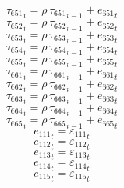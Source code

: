 \begin{dmath}
{{\tau_{651}}}_{t}={{\rho}}\, {{\tau_{651}}}_{t-1}+{{e_{651}}}_{t}
\end{dmath}
\begin{dmath}
{{\tau_{652}}}_{t}={{\rho}}\, {{\tau_{652}}}_{t-1}+{{e_{652}}}_{t}
\end{dmath}
\begin{dmath}
{{\tau_{653}}}_{t}={{\rho}}\, {{\tau_{653}}}_{t-1}+{{e_{653}}}_{t}
\end{dmath}
\begin{dmath}
{{\tau_{654}}}_{t}={{\rho}}\, {{\tau_{654}}}_{t-1}+{{e_{654}}}_{t}
\end{dmath}
\begin{dmath}
{{\tau_{655}}}_{t}={{\rho}}\, {{\tau_{655}}}_{t-1}+{{e_{655}}}_{t}
\end{dmath}
\begin{dmath}
{{\tau_{661}}}_{t}={{\rho}}\, {{\tau_{661}}}_{t-1}+{{e_{661}}}_{t}
\end{dmath}
\begin{dmath}
{{\tau_{662}}}_{t}={{\rho}}\, {{\tau_{662}}}_{t-1}+{{e_{662}}}_{t}
\end{dmath}
\begin{dmath}
{{\tau_{663}}}_{t}={{\rho}}\, {{\tau_{663}}}_{t-1}+{{e_{663}}}_{t}
\end{dmath}
\begin{dmath}
{{\tau_{664}}}_{t}={{\rho}}\, {{\tau_{664}}}_{t-1}+{{e_{664}}}_{t}
\end{dmath}
\begin{dmath}
{{\tau_{665}}}_{t}={{\rho}}\, {{\tau_{665}}}_{t-1}+{{e_{665}}}_{t}
\end{dmath}
\begin{dmath}
{{e_{111}}}_{t}={{\varepsilon_{111}}}_{t}
\end{dmath}
\begin{dmath}
{{e_{112}}}_{t}={{\varepsilon_{112}}}_{t}
\end{dmath}
\begin{dmath}
{{e_{113}}}_{t}={{\varepsilon_{113}}}_{t}
\end{dmath}
\begin{dmath}
{{e_{114}}}_{t}={{\varepsilon_{114}}}_{t}
\end{dmath}
\begin{dmath}
{{e_{115}}}_{t}={{\varepsilon_{115}}}_{t}
\end{dmath}
